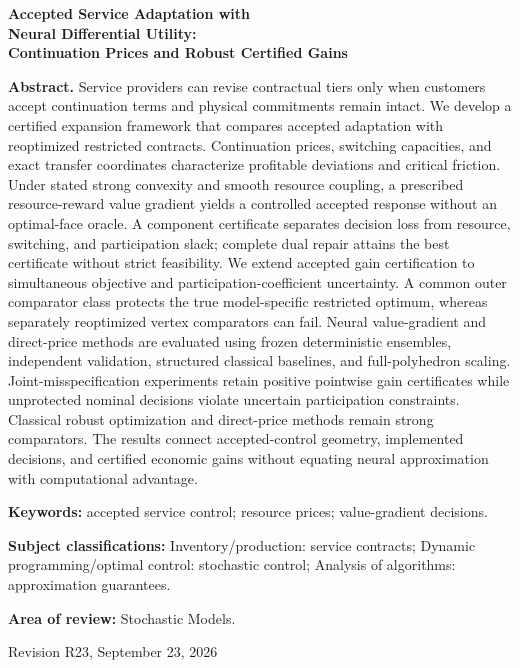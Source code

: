 \documentclass[11pt,letterpaper]{article}
\theoremstyle{definition}
\newcommand{\1}{\mathbf 1}
\begin{document}
\begin{titlepage}\centering
{\Large\bfseries Accepted Service Adaptation with\\ Neural Differential Utility:\\ Continuation Prices and Robust Certified Gains\par}
\vspace{.3in}{Anonymous manuscript for Operations Research\par}\vspace{.25in}
\begin{minipage}{\textwidth}
\textbf{Abstract.}
Service providers can revise contractual tiers only when customers accept continuation terms and physical commitments remain intact. We develop a certified expansion framework that compares accepted adaptation with reoptimized restricted contracts. Continuation prices, switching capacities, and exact transfer coordinates characterize profitable deviations and critical friction. Under stated strong convexity and smooth resource coupling, a prescribed resource-reward value gradient yields a controlled accepted response without an optimal-face oracle. A component certificate separates decision loss from resource, switching, and participation slack; complete dual repair attains the best certificate without strict feasibility. We extend accepted gain certification to simultaneous objective and participation-coefficient uncertainty. A common outer comparator class protects the true model-specific restricted optimum, whereas separately reoptimized vertex comparators can fail. Neural value-gradient and direct-price methods are evaluated using frozen deterministic ensembles, independent validation, structured classical baselines, and full-polyhedron scaling. Joint-misspecification experiments retain positive pointwise gain certificates while unprotected nominal decisions violate uncertain participation constraints. Classical robust optimization and direct-price methods remain strong comparators. The results connect accepted-control geometry, implemented decisions, and certified economic gains without equating neural approximation with computational advantage.
\par\vspace{.16in}\textbf{Keywords:} accepted service control; resource prices; value-gradient decisions.
\par\vspace{.10in}\textbf{Subject classifications:} Inventory/production: service contracts; Dynamic programming/optimal control: stochastic control; Analysis of algorithms: approximation guarantees.
\par\vspace{.10in}\textbf{Area of review:} Stochastic Models.
\end{minipage}\vfill{Revision R23, September 23, 2026\par}\end{titlepage}
\end{document}
